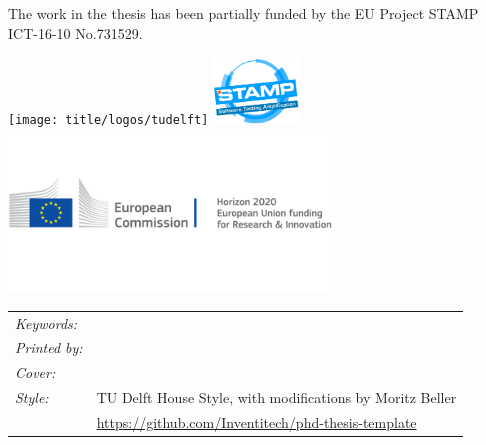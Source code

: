 \begin{titlepage}
\begin{tabular}{p{4.5cm}l}
\end{tabular}


\medskip
\medskip
\noindent 
The work in the thesis has been partially funded by the EU Project STAMP ICT-16-10 No.731529.

\medskip
\vfill
\begin{center}
    \texttt{[image: title/logos/tudelft]}
    \hspace{2em}
    \includegraphics[height=0.7in]{title/logos/stamp} \\
    \includegraphics[height=1.7in]{title/logos/h2020}

\end{center}
\vfill

\noindent
\begin{tabular}{@{}p{}@{}p{}}
  \textit{Keywords:} &  \\[\medskipamount]
      \textit{Printed by:} &  \\[\medskipamount]
      \textit{Cover:} &  \\[\medskipamount]
      \textit{Style:} & TU Delft House Style, with modifications by Moritz Beller \\& \url{https://github.com/Inventitech/phd-thesis-template} \\[\medskipamount]
\end{tabular}


\end{titlepage}
